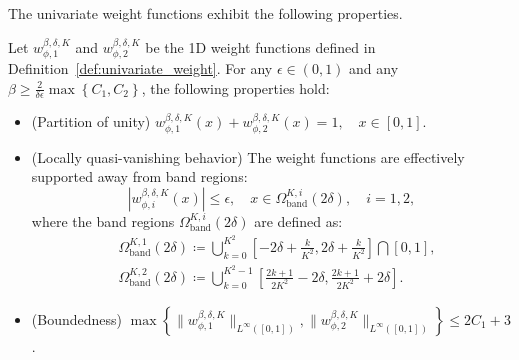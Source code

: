 \documentclass[11pt]{article}
\begin{document}
The univariate weight functions exhibit the following properties.
\begin{proposition}
    Let $w_{\phi,1}^{\beta, \delta, K}$ and $w_{\phi, 2}^{\beta, \delta, K}$ be the 1D weight functions defined in Definition~\ref{def:univariate_weight}. For any $\epsilon \in (0,1)$ and any $\beta \ge \frac{2}{\delta \epsilon} \max \left\{ C_1,C_2 \right\}$, the following properties hold:
    \begin{itemize}
        \item (Partition of unity) $w_{\phi,1}^{\beta, \delta, K} (x) + w_{\phi,2}^{\beta, \delta, K}(x) = 1, \quad x\in [0,1].$
        \item (Locally quasi-vanishing behavior) The weight functions are effectively supported away from band regions:
        \begin{equation*}
            |w_{\phi,i}^{\beta, \delta, K}(x)| \leq \epsilon, \quad x \in \Omega_{\mathrm{band}}^{K,i}(2 \delta), \quad i=1,2,
        \end{equation*}
        where the band regions \( \Omega_{\mathrm{band}}^{K,i}(2\delta) \) are defined as:
        \begin{equation*}
            \begin{aligned}
                & \Omega_{\mathrm{band}}^{K,1}(2\delta)\coloneqq  \bigcup_{k=0}^{K^2} \left[ -2 \delta + \frac{k}{K^2}, 2\delta + \frac{k}{K^2}\right] \bigcap [0,1], \\
                &\Omega_{\mathrm{band}}^{K,2}(2\delta)\coloneqq  \bigcup_{k=0}^{K^2-1} \left[ \frac{2k+1}{2K^2} - 2\delta, \frac{2k+1}{2K^2}+ 2\delta \right].
            \end{aligned}
        \end{equation*}
        \item (Boundedness) $\max \left\{ \|w_{\phi,1}^{\beta,\delta,K}\|_{L^{\infty}([0,1])} , \|w_{\phi,2}^{\beta,\delta,K}\|_{L^{\infty}([0,1])}\right\} \leq 2C_1 +3$.
    \end{itemize}
    \label{prop:univariate_weight}
\end{proposition}
\end{document}
